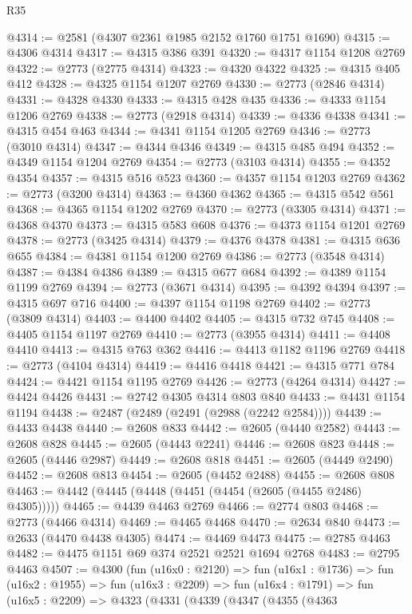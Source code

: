 \begin{lexlean}{R35}
\begin{coremodule}
@4314 := @2581 (@4307 @2361 @1985 @2152 @1760 @1751 @1690)
@4315 := @4306 @4314
@4317 := @4315 @386 @391
@4320 := @4317 @1154 @1208 @2769
@4322 := @2773 (@2775 @4314)
@4323 := @4320 @4322
@4325 := @4315 @405 @412
@4328 := @4325 @1154 @1207 @2769
@4330 := @2773 (@2846 @4314)
@4331 := @4328 @4330
@4333 := @4315 @428 @435
@4336 := @4333 @1154 @1206 @2769
@4338 := @2773 (@2918 @4314)
@4339 := @4336 @4338
@4341 := @4315 @454 @463
@4344 := @4341 @1154 @1205 @2769
@4346 := @2773 (@3010 @4314)
@4347 := @4344 @4346
@4349 := @4315 @485 @494
@4352 := @4349 @1154 @1204 @2769
@4354 := @2773 (@3103 @4314)
@4355 := @4352 @4354
@4357 := @4315 @516 @523
@4360 := @4357 @1154 @1203 @2769
@4362 := @2773 (@3200 @4314)
@4363 := @4360 @4362
@4365 := @4315 @542 @561
@4368 := @4365 @1154 @1202 @2769
@4370 := @2773 (@3305 @4314)
@4371 := @4368 @4370
@4373 := @4315 @583 @608
@4376 := @4373 @1154 @1201 @2769
@4378 := @2773 (@3425 @4314)
@4379 := @4376 @4378
@4381 := @4315 @636 @655
@4384 := @4381 @1154 @1200 @2769
@4386 := @2773 (@3548 @4314)
@4387 := @4384 @4386
@4389 := @4315 @677 @684
@4392 := @4389 @1154 @1199 @2769
@4394 := @2773 (@3671 @4314)
@4395 := @4392 @4394
@4397 := @4315 @697 @716
@4400 := @4397 @1154 @1198 @2769
@4402 := @2773 (@3809 @4314)
@4403 := @4400 @4402
@4405 := @4315 @732 @745
@4408 := @4405 @1154 @1197 @2769
@4410 := @2773 (@3955 @4314)
@4411 := @4408 @4410
@4413 := @4315 @763 @362
@4416 := @4413 @1182 @1196 @2769
@4418 := @2773 (@4104 @4314)
@4419 := @4416 @4418
@4421 := @4315 @771 @784
@4424 := @4421 @1154 @1195 @2769
@4426 := @2773 (@4264 @4314)
@4427 := @4424 @4426
@4431 := @2742 @4305 @4314 @803 @840
@4433 := @4431 @1154 @1194
@4438 := @2487 (@2489 (@2491 (@2988 (@2242 @2584))))
@4439 := @4433 @4438
@4440 := @2608 @833
@4442 := @2605 (@4440 @2582)
@4443 := @2608 @828
@4445 := @2605 (@4443 @2241)
@4446 := @2608 @823
@4448 := @2605 (@4446 @2987)
@4449 := @2608 @818
@4451 := @2605 (@4449 @2490)
@4452 := @2608 @813
@4454 := @2605 (@4452 @2488)
@4455 := @2608 @808
@4463 := @4442 (@4445 (@4448 (@4451 (@4454 (@2605 (@4455 @2486) @4305)))))
@4465 := @4439 @4463 @2769
@4466 := @2774 @803
@4468 := @2773 (@4466 @4314)
@4469 := @4465 @4468
@4470 := @2634 @840
@4473 := @2633 (@4470 @4438 @4305)
@4474 := @4469 @4473
@4475 := @2785 @4463
@4482 := @4475 @1151 @69 @374 @2521 @2521 @1694 @2768
@4483 := @2795 @4463
@4507 := @4300
    (fun (u16x0 : @2120) =>
    fun (u16x1 : @1736) =>
    fun (u16x2 : @1955) =>
    fun (u16x3 : @2209) =>
    fun (u16x4 : @1791) =>
    fun (u16x5 : @2209) =>
    @4323
      (@4331
        (@4339
          (@4347
            (@4355
              (@4363

\end{coremodule}
\end{lexlean}
